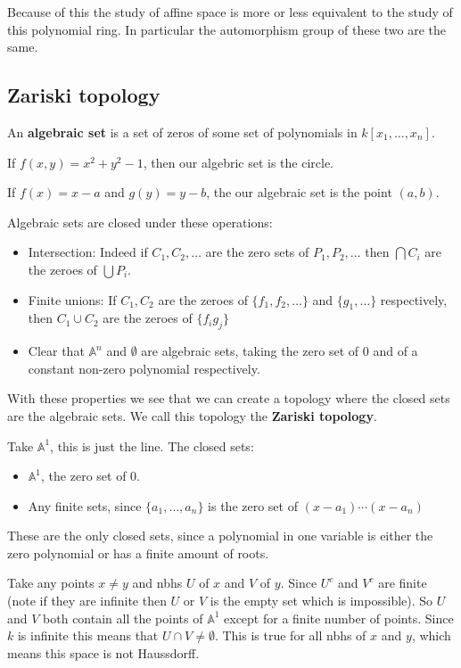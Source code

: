 Because of this the study of affine space is more or less equivalent to the study of this polynomial ring. In particular the automorphism group of these two are the same.

\subsection{Zariski topology}
\begin{definition}
    An \textbf{algebraic set} is a set of zeros of some set of polynomials in $k[x_1,\dots,x_n]$. 
\end{definition}

\begin{example}
    If $f(x,y) = x^2+y^2-1$, then our algebric set is the circle. 
\end{example}
\begin{example}
    If $f(x) = x-a$ and $g(y) = y-b$, the our algebraic set is the point $(a,b)$.
\end{example}

Algebraic sets are closed under these operations:\begin{itemize}
    \item Intersection: Indeed if $C_1,C_2,\dots$ are the zero sets of $P_1,P_2,\dots$ then $\bigcap C_i$ are the zeroes of $\bigcup P_i$.
    \item Finite unions: If $C_1,C_2$ are the zeroes of $\{f_1,f_2,\dots\}$ and $\{g_1,\dots\}$ respectively, then $C_1\cup C_2$ are the zeroes of $\{{f_i}{g_j}\}$
    \item Clear that $\mathbb{A}^n$ and $\emptyset$ are algebraic sets, taking the zero set of $0$ and of a constant non-zero polynomial respectively.
\end{itemize}

With these properties we see that we can create a topology where the closed sets are the algebraic sets. We call this topology the \textbf{Zariski topology}. 

\begin{example}
    Take ${\mathbb{A}^1}$, this is just the line. The closed sets:\begin{itemize}
        \item $\mathbb{A}^1$, the zero set of $0$.
        \item Any finite sets, since $\{a_1,\dots,a_n\}$ is the zero set of $(x-a_1)\cdots (x-a_n)$
    \end{itemize}

These are the only closed sets, since a polynomial in one variable is either the zero polynomial or has a finite amount of roots.


Take any points $x\neq y$ and nbhs $U$ of $x$ and $V$ of $y$. Since $U^c$ and $V^c$ are finite (note if they are infinite then $U$ or $V$ is the empty set which is impossible). So $U$ and $V$ both contain all the points of $\mathbb{A}^1$
except for a finite number of points. Since $k$ is infinite this means that $U\cap V \neq \emptyset$. This is true for all nbhs of $x$ and $y$, which means this space is not Haussdorff.
\end{example}

